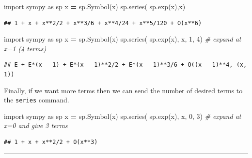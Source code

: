 \documentclass[
]{book}
\newenvironment{Shaded}{\begin{snugshade}}{\end{snugshade}}
\newcommand{\CommentTok}[1]{\textcolor[rgb]{0.56,0.35,0.01}{\textit{#1}}}
\newcommand{\DecValTok}[1]{\textcolor[rgb]{0.00,0.00,0.81}{#1}}
\newcommand{\ImportTok}[1]{#1}
\newcommand{\NormalTok}[1]{#1}
\newcommand{\OperatorTok}[1]{\textcolor[rgb]{0.81,0.36,0.00}{\textbf{#1}}}
\newcommand{\StringTok}[1]{\textcolor[rgb]{0.31,0.60,0.02}{#1}}
\theoremstyle{definition}
\theoremstyle{definition}
\theoremstyle{definition}
\theoremstyle{remark}
\begin{document}
\begin{Shaded}
\begin{Highlighting}[]
\ImportTok{import}\NormalTok{ sympy }\ImportTok{as}\NormalTok{ sp}
\NormalTok{x }\OperatorTok{=}\NormalTok{ sp.Symbol(}\StringTok{\textquotesingle{}x\textquotesingle{}}\NormalTok{)}
\NormalTok{sp.series( sp.exp(x),x)}
\end{Highlighting}
\end{Shaded}

\begin{verbatim}
## 1 + x + x**2/2 + x**3/6 + x**4/24 + x**5/120 + O(x**6)
\end{verbatim}

\begin{Shaded}
\begin{Highlighting}[]
\ImportTok{import}\NormalTok{ sympy }\ImportTok{as}\NormalTok{ sp}
\NormalTok{x }\OperatorTok{=}\NormalTok{ sp.Symbol(}\StringTok{\textquotesingle{}x\textquotesingle{}}\NormalTok{)}
\NormalTok{sp.series( sp.exp(x), x, }\DecValTok{1}\NormalTok{, }\DecValTok{4}\NormalTok{) }\CommentTok{\# expand at x=1 (4 terms)}
\end{Highlighting}
\end{Shaded}

\begin{verbatim}
## E + E*(x - 1) + E*(x - 1)**2/2 + E*(x - 1)**3/6 + O((x - 1)**4, (x, 1))
\end{verbatim}

Finally, if we want more terms then we can send the number of desired
terms to the \texttt{series} command.

\begin{Shaded}
\begin{Highlighting}[]
\ImportTok{import}\NormalTok{ sympy }\ImportTok{as}\NormalTok{ sp}
\NormalTok{x }\OperatorTok{=}\NormalTok{ sp.Symbol(}\StringTok{\textquotesingle{}x\textquotesingle{}}\NormalTok{)}
\NormalTok{sp.series( sp.exp(x), x, }\DecValTok{0}\NormalTok{, }\DecValTok{3}\NormalTok{) }\CommentTok{\# expand at x=0 and give 3 terms}
\end{Highlighting}
\end{Shaded}

\begin{verbatim}
## 1 + x + x**2/2 + O(x**3)
\end{verbatim}

\begin{center}\rule{0.5\linewidth}{0.5pt}\end{center}
\end{document}
